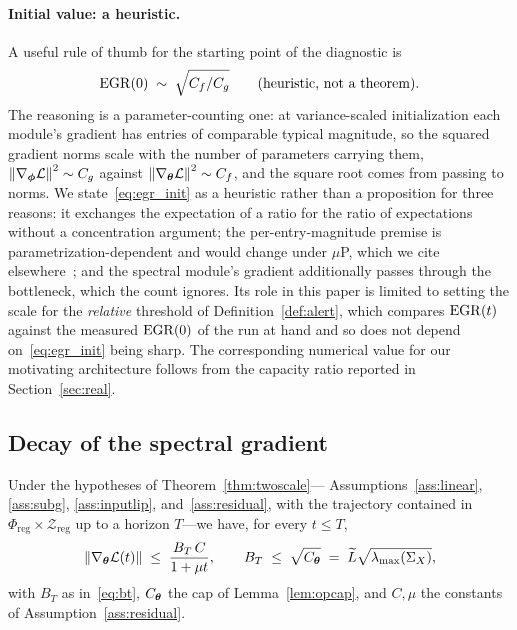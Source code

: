 \paragraph{Initial value: a heuristic.}
A useful rule of thumb for the starting point of the diagnostic is
\begin{equation}
\label{eq:egr_init}
    \mathrm{EGR}(0) \;\sim\; \sqrt{C_f / C_g}
    \qquad \text{(heuristic, not a theorem).}
\end{equation}
The reasoning is a parameter-counting one: at variance-scaled
initialization each module's gradient has entries of comparable
typical magnitude, so the squared gradient norms scale with the
number of parameters carrying them,
$\left\lVert\nabla_{\boldsymbol{\phi}} \mathcal{L}\right\rVert^2 \sim C_g$ against
$\left\lVert\nabla_{\boldsymbol{\theta}} \mathcal{L}\right\rVert^2 \sim C_f$, and the square root comes
from passing to norms. We state~\eqref{eq:egr_init} as a heuristic
rather than a proposition for three reasons: it exchanges the
expectation of a ratio for the ratio of expectations without a
concentration argument; the per-entry-magnitude premise is
parametrization-dependent and would change under $\mu$P, which we
cite elsewhere~\cite{yang2021tensor}; and the spectral module's
gradient additionally passes through the bottleneck, which the count
ignores. Its role in this paper is limited to setting the scale for
the \emph{relative} threshold of Definition~\ref{def:alert}, which
compares $\mathrm{EGR}(t)$ against the measured $\mathrm{EGR}(0)$ of the run at hand
and so does not depend on~\eqref{eq:egr_init} being sharp. The
corresponding numerical value for our motivating architecture follows
from the capacity ratio reported in Section~\ref{sec:real}.

\subsection{Decay of the spectral gradient}

\begin{proposition}
\label{prop:egr_monotonic}
Under the hypotheses of Theorem~\ref{thm:twoscale}---%
Assumptions~\ref{ass:linear}, \ref{ass:subg}, \ref{ass:inputlip},
and~\ref{ass:residual}, with the trajectory contained in
$\Phi_{\mathrm{reg}} \times \mathcal{Z}_{\mathrm{reg}}$ up to a
horizon $T$---we have, for every $t \leq T$,
\[
    \left\lVert\nabla_{\boldsymbol{\theta}} \mathcal{L}(t)\right\rVert
    \;\leq\; \frac{B_T\,C}{1 + \mu t},
    \qquad
    B_T \;\leq\; \sqrt{C_{\boldsymbol{\theta}}}
    \;=\; \widetilde{L}\sqrt{\lambda_{\max}(\Sigma_X)},
\]
with $B_T$ as in~\eqref{eq:bt}, $C_{\boldsymbol{\theta}}$ the cap of
Lemma~\ref{lem:opcap}, and $C, \mu$ the constants of
Assumption~\ref{ass:residual}.
\end{proposition}

